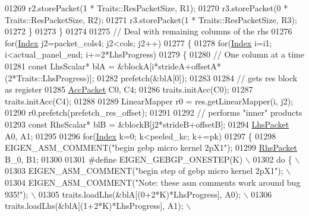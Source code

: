 \begin{DoxyCode}
01269           r2.storePacket(1 * Traits::ResPacketSize, R1);
01270           r3.storePacket(0 * Traits::ResPacketSize, R2);
01271           r3.storePacket(1 * Traits::ResPacketSize, R3);
01272           \}
01273         \}
01274       
01275         \textcolor{comment}{// Deal with remaining columns of the rhs}
01276         \textcolor{keywordflow}{for}(\hyperlink{namespace_eigen_a62e77e0933482dafde8fe197d9a2cfde}{Index} j2=packet\_cols4; j2<cols; j2++)
01277         \{
01278           \textcolor{keywordflow}{for}(\hyperlink{namespace_eigen_a62e77e0933482dafde8fe197d9a2cfde}{Index} i=i1; i<actual\_panel\_end; i+=2*LhsProgress)
01279           \{
01280           \textcolor{comment}{// One column at a time}
01281           \textcolor{keyword}{const} LhsScalar* blA = &blockA[i*strideA+offsetA*(2*Traits::LhsProgress)];
01282           prefetch(&blA[0]);
01283 
01284           \textcolor{comment}{// gets res block as register}
01285           \hyperlink{class_eigen_1_1internal_1_1_tensor_lazy_evaluator_writable}{AccPacket} C0, C4;
01286           traits.initAcc(C0);
01287           traits.initAcc(C4);
01288 
01289           LinearMapper r0 = res.getLinearMapper(i, j2);
01290           r0.prefetch(prefetch\_res\_offset);
01291 
01292           \textcolor{comment}{// performs "inner" products}
01293           \textcolor{keyword}{const} RhsScalar* blB = &blockB[j2*strideB+offsetB];
01294           \hyperlink{class_eigen_1_1internal_1_1_tensor_lazy_evaluator_writable}{LhsPacket} A0, A1;
01295 
01296           \textcolor{keywordflow}{for}(\hyperlink{namespace_eigen_a62e77e0933482dafde8fe197d9a2cfde}{Index} k=0; k<peeled\_kc; k+=pk)
01297           \{
01298             EIGEN\_ASM\_COMMENT(\textcolor{stringliteral}{"begin gebp micro kernel 2pX1"});
01299             \hyperlink{class_eigen_1_1internal_1_1_tensor_lazy_evaluator_writable}{RhsPacket} B\_0, B1;
01300         
01301 \textcolor{preprocessor}{#define EIGEN\_GEBGP\_ONESTEP(K) \(\backslash\)}
01302 \textcolor{preprocessor}{            do \{                                                                  \(\backslash\)}
01303 \textcolor{preprocessor}{              EIGEN\_ASM\_COMMENT("begin step of gebp micro kernel 2pX1");          \(\backslash\)}
01304 \textcolor{preprocessor}{              EIGEN\_ASM\_COMMENT("Note: these asm comments work around bug 935!"); \(\backslash\)}
01305 \textcolor{preprocessor}{              traits.loadLhs(&blA[(0+2*K)*LhsProgress], A0);                      \(\backslash\)}
01306 \textcolor{preprocessor}{              traits.loadLhs(&blA[(1+2*K)*LhsProgress], A1);                      \(\backslash\)}

\end{DoxyCode}
